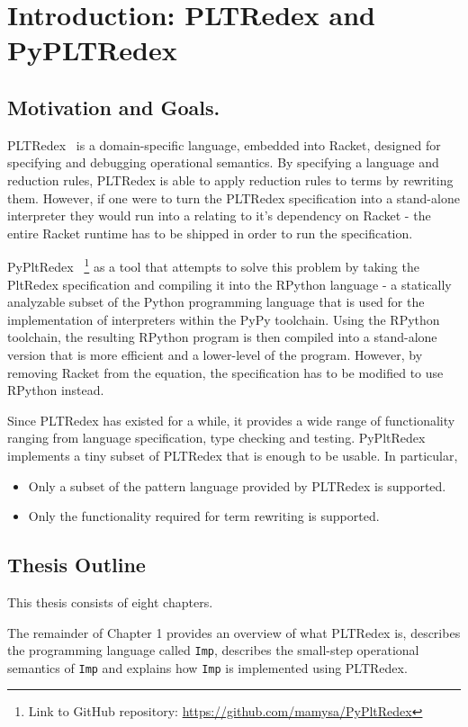\chapter{Introduction: PLTRedex and PyPLTRedex}
\section{Motivation and Goals.}
PLTRedex~\cite{pltredex} is a domain-specific language, embedded into Racket, designed for specifying and debugging operational semantics. By specifying a language and reduction rules, PLTRedex is able to apply reduction rules to terms by rewriting them.
However, if one were to turn the PLTRedex specification into a stand-alone interpreter they would run into a relating to it's dependency on Racket - the entire Racket runtime has to be shipped in order to run the specification.

PyPltRedex~\cite{pypltredex-github} \footnote{Link to GitHub repository: \url{https://github.com/mamysa/PyPltRedex}} as a tool that attempts to solve this problem by taking the PltRedex specification and compiling it into the RPython language - a statically analyzable subset of the Python programming language that is used for the implementation of interpreters within the PyPy toolchain. Using the RPython toolchain, the resulting RPython program is then compiled into a stand-alone version that is more efficient and a lower-level of the program. However, by removing Racket from the equation, the specification has to be modified to use RPython instead.

Since PLTRedex has existed for a while, it provides a wide range of functionality ranging from language specification, type checking and testing. PyPltRedex implements a tiny subset of PLTRedex that is enough to be usable. In particular,

\begin{itemize}
\item Only a subset of the pattern language provided by PLTRedex is supported.
\item
Only the functionality required for term rewriting is supported.
\end{itemize}

\section{Thesis Outline}
This thesis consists of eight chapters.

The remainder of Chapter 1 provides an overview of what PLTRedex is, describes the programming language called \texttt{Imp}, describes the small-step operational semantics of \texttt{Imp} and explains how \texttt{Imp} is implemented using PLTRedex.

